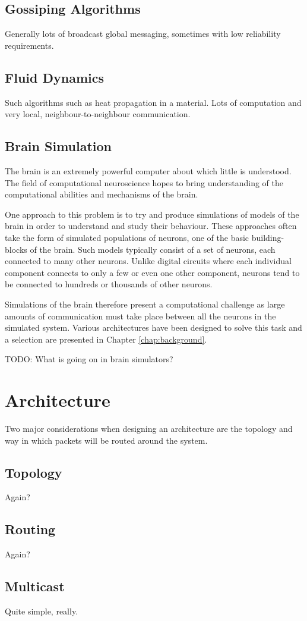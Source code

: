 		\subsection{Gossiping Algorithms}
			
			Generally lots of broadcast global messaging, sometimes with low
			reliability requirements.
		
		\subsection{Fluid Dynamics}
			
			Such algorithms such as heat propagation in a material. Lots of
			computation and very local, neighbour-to-neighbour communication.
		
		\subsection{Brain Simulation}
			
			
			The brain is an extremely powerful computer about which little is
			understood. The field of computational neuroscience hopes to bring
			understanding of the computational abilities and mechanisms of the
			brain.
			
			One approach to this problem is to try and produce simulations of models
			of the brain in order to understand and study their behaviour. These
			approaches often take the form of simulated populations of neurons, one
			of the basic building-blocks of the brain. Such models typically consist
			of a set of neurons, each connected to many other neurons.  Unlike
			digital circuits where each individual component connects to only a few
			or even one other component, neurons tend to be connected to hundreds or
			thousands of other neurons.
			
			Simulations of the brain therefore present a computational challenge as
			large amounts of communication must take place between all the neurons
			in the simulated system. Various architectures have been designed to
			solve this task and a selection are presented in Chapter
			\ref{chap:background}.
			
			TODO: What is going on in brain simulators?
	
	\section{Architecture}
		
		Two major considerations when designing an architecture are the topology and
		way in which packets will be routed around the system.
		
		\subsection{Topology}
			
			Again?
		
		\subsection{Routing}
			
			Again?
		
		\subsection{Multicast}
			
			Quite simple, really.

